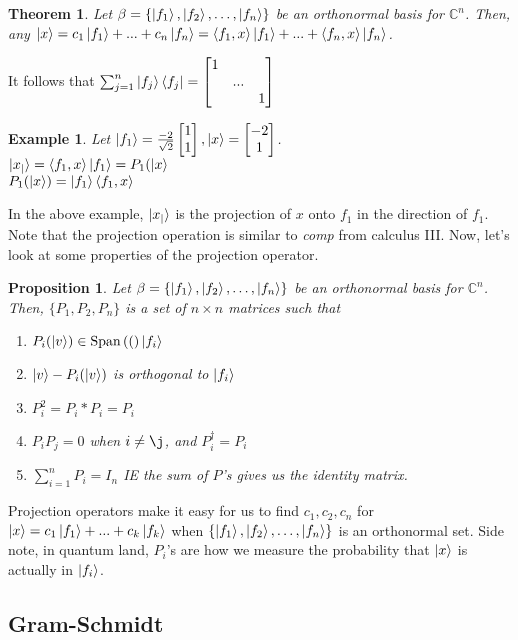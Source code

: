 \documentclass[12pt]{article}
\theoremstyle{plain}
\newtheorem{proposition}[lemma]{Proposition}
\newtheorem{theorem}[lemma]{Theorem}
\theoremstyle{nonumberplain}
\theoremstyle{plain}
\newtheorem{example}[lemma]{Example}
\theoremstyle{nonumberplain}
\newcommand\1{{\bf 1}}
\newcommand{\bmat}[1]{\begin{bmatrix*} #1 \end{bmatrix*}} %
\newcommand{\C}{\mathbb{C}} %
\newcommand{\<}{\left\langle}
\renewcommand{\>}{\right\rangle}
\newcommand{\lp}{\left(}
\newcommand{\rp}{\right)}
\newcommand{\lb}{\left\{}
\newcommand{\rb}{\right\}}
\newcommand{\inp}[2]{\left\langle#1, #2\right\rangle} %
\newcommand{\spn}[1]{\text{Span}\lp #1\rp} %
\newcommand{\setofkets}[1]{\lb \ket{#1_1}, \ket{#1_2}, \ldots, \ket{#1_n}\rb} %
\begin{document}
\begin{theorem}
Let $\beta=\setofkets{f}$ be an orthonormal basis for $\C^n$. Then, any $\ket{x}=c_1\ket{f_1}+...+c_n\ket{f_n}=\inp{f_1}{x}\ket{f_1}+...+\inp{f_n}{x}\ket{f_n}$.
\end{theorem}
It follows that $\sum_{j=1}^{n} \ket{f_j}\bra{f_j}=\bmat{1 &  &  \\  & ... &  \\  &  &  1}$

\begin{example}
Let $\ket{f_1}=\frac{-2}{\sqrt{2}}\bmat{1 \\ 1},\ket{x}=\bmat{-2 \\ 1}$. \\
$\ket{x_|}=\inp{f_1}{x}\ket{f_1}=P_1(\ket{x}$ \\
$P_1(\ket{x})=\ket{f_1}\inp{f_1}{x}$
\end{example}
In the above example, $\ket{x_|}$ is the projection of $x$ onto $f_1$ in the direction of $f_1$.
Note that the projection operation is similar to \textit{comp} from calculus III. Now, let's look at some properties of the projection operator.
\begin{proposition}
Let $\beta=\setofkets{f}$ be an orthonormal basis for $\C^n$. Then, $\lbrace P_1, P_2, P_n\rbrace$ is a set of $n\times n$ matrices such that
\begin{enumerate}
\item $P_i(\ket{v})\in\spn(\ket{f_i}$
\item $\ket{v}-P_i(\ket{v})$ is orthogonal to $\ket{f_i}$
\item $P_i^2=P_i*P_i=P_i$
\item $P_iP_j=0$ when $i\neq\j$, and $P_i^\dagger=P_i$
\item $\sum_{i=1}^{n} P_i=I_n$ IE the sum of $P$'s gives us the identity matrix.
\end{enumerate}
\end{proposition}

Projection operators make it easy for us to find $c_1, c_2, c_n$ for $\ket{x}=c_1\ket{f_1}+...+c_k\ket{f_k}$ when $\setofkets{f}$ is an orthonormal set. Side note, in quantum land, $P_i$'s are how we measure the probability that $\ket{x}$ is actually in $\ket{f_i}$.


\subsection{Gram-Schmidt}
\end{document}
